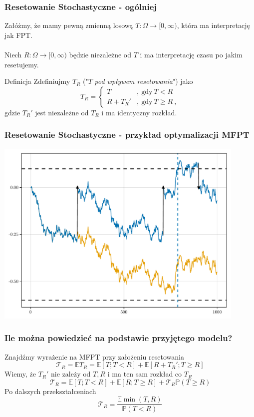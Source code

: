 \documentclass{beamer}
\newcommand{\p}{\mathbb{P}}
\newcommand{\E}{\mathbb{E}}
\newcommand{\1}{\mathbb{1}}
\newcommand{\T}{\mathcal{T}}
\begin{document}
\begin{frame}
\frametitle{Resetowanie Stochastyczne - ogólniej}
Załóżmy, że mamy pewną zmienną losową $T:\Omega \to [0, \infty)$, która ma interpretację jak FPT. \\~\\
\pause
Niech $R:\Omega \to [0, \infty)$ będzie niezależne od $T$ i ma interpretację czasu po jakim resetujemy.
\pause
\begin{block}{Definicja}
Zdefiniujmy\footnotemark{} $T_R$ ("$T$ \emph{pod wpływem resetowania}") jako
\begin{equation}
T_R = \begin{cases}
T &,~\text{gdy}~ T < R \\
R + T_R' &,~\text{gdy}~ T \ge R~,
\end{cases}
\end{equation}
gdzie $T_R'$ jest niezależne od $T_R$ i ma identyczny rozkład.
\end{block}

\end{frame}

\begin{frame}
\frametitle{Resetowanie Stochastyczne - przykład optymalizacji MFPT}
\includegraphics[width=0.9\textwidth]{wiener-sim/tr-resetting.pdf}
\end{frame}


\begin{frame}
\frametitle{Ile można powiedzieć na podstawie przyjętego modelu?}
Znajdźmy wyrażenie na MFPT przy założeniu resetowania
\begin{equation}
\T_R = \E T_R = \E [T ; T < R] + \E [R + T_R' ; T \ge  R]
\end{equation}
\pause
Wiemy, że $T_R'$ nie zależy od $T, R$ i ma ten sam rozkład co $T_R$
\begin{equation}
\T_R = \E [T ; T < R] + \E [R; T \ge  R] + \T_R \p( T \ge  R)
\end{equation}
\pause
Po dalszych przekształceniach
\begin{equation}
\boxed{   \T_R = \frac{\E \min{(T, R)}}{\p(T < R)}   }
\end{equation}
\end{frame}
\end{document}
